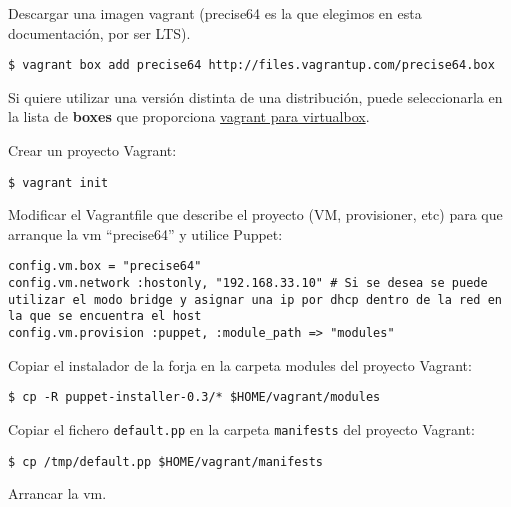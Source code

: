 \par Descargar una imagen vagrant (precise64 es la que elegimos en esta documentación, por ser LTS).

\lstset{style=bashbasico}
\begin{lstlisting}[frame=trbl]
    $ vagrant box add precise64 http://files.vagrantup.com/precise64.box
\end{lstlisting}

\par Si quiere utilizar una versión distinta de una distribución, puede seleccionarla en la lista de \textbf{boxes} que proporciona \href{http://www.vagrantbox.es/}{vagrant para virtualbox}.

\par Crear un proyecto Vagrant:

\lstset{style=bashbasico}
\begin{lstlisting}[frame=trbl]
    $ vagrant init
\end{lstlisting}

\par Modificar el Vagrantfile que describe el proyecto (VM, provisioner, etc) para que arranque la vm ``precise64'' y utilice Puppet:

\lstset{style=bashbasico}
\begin{lstlisting}[frame=trbl]
config.vm.box = "precise64"
config.vm.network :hostonly, "192.168.33.10" # Si se desea se puede utilizar el modo bridge y asignar una ip por dhcp dentro de la red en la que se encuentra el host
config.vm.provision :puppet, :module_path => "modules"

\end{lstlisting}

\par Copiar el instalador de la forja en la carpeta modules del proyecto Vagrant:

\lstset{style=bashbasico}
\begin{lstlisting}[frame=trbl]
    $ cp -R puppet-installer-0.3/* $HOME/vagrant/modules
\end{lstlisting}

\par Copiar el fichero \texttt{default.pp} en la carpeta \texttt{manifests} del proyecto Vagrant:

\lstset{style=bashbasico}
\begin{lstlisting}[frame=trbl]
    $ cp /tmp/default.pp $HOME/vagrant/manifests
\end{lstlisting}

\par Arrancar la vm.

